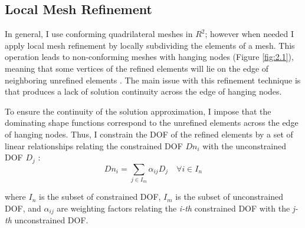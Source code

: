 \subsection{Local Mesh Refinement}
In general, I use conforming quadrilateral meshes in $R^2$; however when needed I apply local mesh refinement by locally subdividing the elements of a mesh.  This operation leads to non-conforming meshes with hanging nodes (Figure \ref{fig:2.1}), meaning that some vertices of the refined elements will lie on the edge of neighboring unrefined elements \cite{Solin2008}. The main issue with this refinement technique is that  produces a lack of solution continuity across the edge of hanging nodes.

To ensure the continuity of the solution approximation, I impose that the dominating shape functions correspond to the unrefined elements across the edge of hanging nodes. Thus, I constrain the  DOF  of the refined elements  by a set of linear relationships relating the constrained  DOF $Dn_i$  with the unconstrained  DOF $D_j$ \cite{Bangerth2009}:
 \begin{equation} \label{Eq2.9}
   Dn_i= \sum_{j \in  I_m}\alpha_{ij} D_j \quad  \forall i \in I_n
 \end{equation}

where $I_n$ is the subset of constrained DOF, $I_m$ is the subset of unconstrained DOF, and $\alpha_{ij}$ are weighting factors relating the \textit{i-th} constrained DOF with the \textit{j-th} unconstrained DOF.

